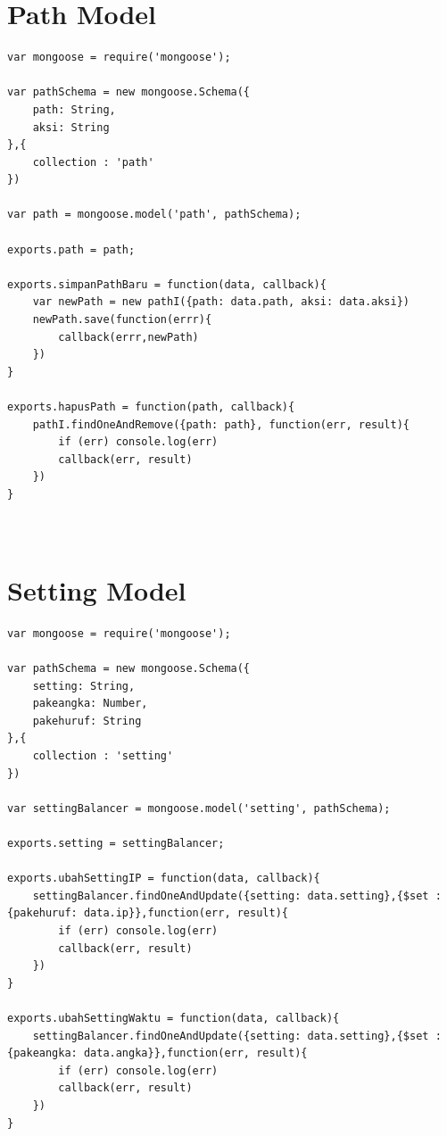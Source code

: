 \documentclass{ta-its}
\begin{document}
		\section{Path Model}
			\begin{lstlisting}[frame=single,tabsize=2,breaklines,caption={Path Model untuk Koleksi URL},label=pathModel]	
var mongoose = require('mongoose');

var pathSchema = new mongoose.Schema({
	path: String,
	aksi: String
},{
	collection : 'path'
})

var path = mongoose.model('path', pathSchema);

exports.path = path;

exports.simpanPathBaru = function(data, callback){
	var newPath = new pathI({path: data.path, aksi: data.aksi})
	newPath.save(function(errr){
		callback(errr,newPath)
	})
}

exports.hapusPath = function(path, callback){
	pathI.findOneAndRemove({path: path}, function(err, result){
		if (err) console.log(err)
		callback(err, result)
	})
}

			
			\end{lstlisting}
		
		\section{Setting Model}
			\begin{lstlisting}[frame=single,tabsize=2,breaklines,caption={Setting Model untuk Koleksi Setting},label=settingModel]	
var mongoose = require('mongoose');

var pathSchema = new mongoose.Schema({
	setting: String,
	pakeangka: Number,
	pakehuruf: String
},{
	collection : 'setting'
})

var settingBalancer = mongoose.model('setting', pathSchema);

exports.setting = settingBalancer;

exports.ubahSettingIP = function(data, callback){
	settingBalancer.findOneAndUpdate({setting: data.setting},{$set : {pakehuruf: data.ip}},function(err, result){
		if (err) console.log(err)
		callback(err, result)
	})
}

exports.ubahSettingWaktu = function(data, callback){
	settingBalancer.findOneAndUpdate({setting: data.setting},{$set : {pakeangka: data.angka}},function(err, result){
		if (err) console.log(err)
		callback(err, result)
	})
}
			
			\end{lstlisting}
	
\end{document}
